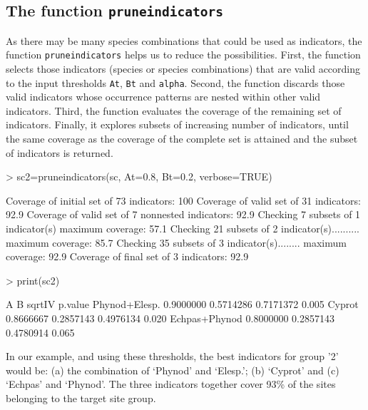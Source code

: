 \documentclass[11pt,a4paper]{article}
\begin{document}
\subsection{The function \texttt{pruneindicators}}
As there may be many species combinations that could be used as indicators, the function \texttt{pruneindicators} helps us to reduce the possibilities. First, the function selects those indicators (species or species combinations) that are valid according to the input thresholds \texttt{At}, \texttt{Bt} and \texttt{alpha}. Second, the function discards those valid indicators whose occurrence patterns are nested within other valid indicators. Third, the function evaluates the coverage of the remaining set of indicators. Finally, it explores subsets of increasing number of indicators, until the same coverage as the coverage of the complete set is attained and the subset of indicators is returned.
\begin{Schunk}
\begin{Sinput}
> sc2=pruneindicators(sc, At=0.8, Bt=0.2, verbose=TRUE)
\end{Sinput}
\begin{Soutput}
Coverage of initial set of 73 indicators: 100%
Coverage of valid set of 31 indicators: 92.9%
Coverage of valid set of 7 nonnested indicators: 92.9%
Checking 7 subsets of 1 indicator(s) maximum coverage: 57.1%
Checking 21 subsets of 2 indicator(s).......... maximum coverage: 85.7%
Checking 35 subsets of 3 indicator(s)........ maximum coverage: 92.9%
Coverage of final set of 3 indicators: 92.9%
\end{Soutput}
\begin{Sinput}
> print(sc2)
\end{Sinput}
\begin{Soutput}
                      A         B    sqrtIV p.value
Phynod+Elesp. 0.9000000 0.5714286 0.7171372   0.005
Cyprot        0.8666667 0.2857143 0.4976134   0.020
Echpas+Phynod 0.8000000 0.2857143 0.4780914   0.065
\end{Soutput}
\end{Schunk}
In our example, and using these thresholds, the best indicators for group '2' would be: (a) the combination of `Phynod' and `Elesp.'; (b) `Cyprot' and (c) `Echpas' and `Phynod'. The three indicators together cover 93\% of the sites belonging to the target site group.
\end{document}
